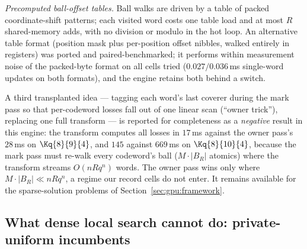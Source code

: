 \emph{Precomputed ball-offset tables.} Ball walks are driven by a table of
packed coordinate-shift patterns; each visited word costs one table load
and at most $R$ shared-memory adds, with no division or modulo in the hot
loop. An alternative table format (position mask plus per-position offset
nibbles, walked entirely in registers) was ported and paired-benchmarked;
it performs within measurement noise of the packed-byte format on all
cells tried ($0.027/0.036$\,ms single-word updates on both formats), and
the engine retains both behind a switch.

A third transplanted idea --- tagging each word's last coverer during the
mark pass so that per-codeword losses fall out of one linear scan
(``owner trick''), replacing one full transform --- is reported for
completeness as a \emph{negative} result in this engine: the transform
computes all losses in $17$\,ms against the owner pass's $28$\,ms on
$\Kq{8}{9}{4}$, and $145$ against $669$\,ms on $\Kq{8}{10}{4}$, because
the mark pass must re-walk every codeword's ball ($M\cdot|B_R|$ atomics)
where the transform streams $O(nRq^n)$ words. The owner pass wins only
where $M\cdot|B_R|\ll nRq^n$, a regime our record cells do not enter.
It remains available for the sparse-solution problems of
Section~\ref{sec:gpu:framework}.

\subsection{What dense local search cannot do: private-uniform
incumbents}\label{sec:gpu:rigid}

